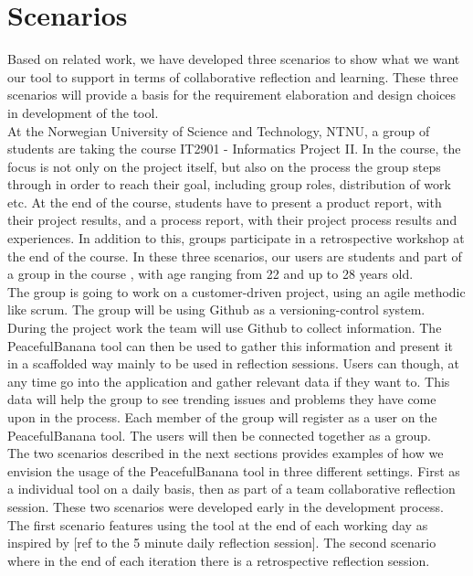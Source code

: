 \section{Scenarios}
\label{problemdefinition}
Based on related work, we have developed three scenarios to show what we want our tool to support in terms of collaborative reflection and learning. These three scenarios will provide a basis for the requirement elaboration and design choices in development of the tool. 
\\
At the Norwegian University of Science and Technology, NTNU, a group of students are taking the course IT2901 - Informatics Project II\footnotemark.
In the course, the focus is not only on the project itself, but also on the process the group steps through in order to reach their goal, including group roles, distribution of work etc. At the end of the course, students have to present a product report, with their project results, and a process report, with their project process results and experiences. In addition to this, groups participate in a retrospective workshop at the end of the course. In these three scenarios, our users are students and part of a group in the course , with age ranging from 22 and up to 28 years old.
\\
The group is going to work on a customer-driven project, using an agile methodic like scrum. The group will be using Github as a versioning-control system. During the project work the team will use Github to collect information. The PeacefulBanana tool can then be used to gather this information and present it in a scaffolded way mainly to be used in reflection sessions. Users can though, at any time go into the application and gather relevant data if they want to. This data will help the group to see trending issues and problems they have come upon in the process. Each member of the group will register as a user on the PeacefulBanana tool. The users will then be connected together as a group. 
\\
The two scenarios described in the next sections provides examples of how we envision the usage of the PeacefulBanana tool in three different settings. First as a individual tool on a daily basis, then as part of a team collaborative reflection session.
These two scenarios were developed early in the development process. The first scenario features using the tool at the end of each working day as inspired by [ref to the 5 minute daily reflection session]. The second scenario where in the end of each iteration there is a retrospective reflection session. 
\\

